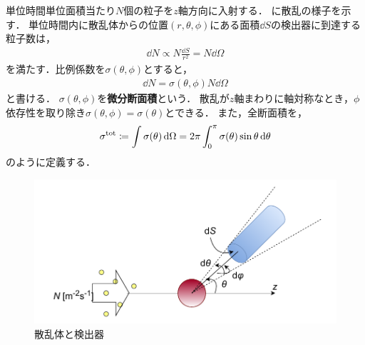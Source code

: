 \documentclass{report}
\begin{document}
  単位時間単位面積当たり$N$個の粒子を$z$軸方向に入射する．
  に散乱の様子を示す．
  単位時間内に散乱体からの位置$(r,\theta,\phi)$にある面積$\dd{S}$の検出器に到達する粒子数は，
  \begin{align}
    \dd{N} \propto N \frac{\dd{S}}{r^2} = N\dd{\Omega}
  \end{align}
  を満たす．比例係数を$\sigma (\theta, \phi)$とすると，
  \begin{align}
    \dd{N} = \sigma(\theta, \phi) N \dd{\Omega}
  \end{align}
  と書ける．
  $\sigma(\theta, \phi)$を\textbf{微分断面積}という．
  散乱が$z$軸まわりに軸対称なとき，$\phi$依存性を取り除き$\sigma(\theta, \phi) = \sigma (\theta)$とできる．
  また，全断面積を，
  \begin{align}
    \sigma^{\mathrm{tot}} \coloneqq \int \sigma(\theta) \dd{\Omega} = 2\pi \int_{0}^{\pi} \sigma(\theta) \sin \theta \dd{\theta}\label{total-area}
  \end{align}
  のように定義する．
  \begin{figure}[H]
    \centering
    \includegraphics[width = 0.6\columnwidth]{fig/scattering_diagram.pdf}
    \caption{散乱体と検出器}\label{scattering_detection}
  \end{figure}
\end{document}
